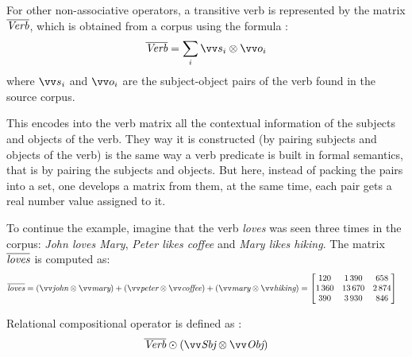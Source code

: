 
For other non-associative operators, a transitive verb is represented by the matrix $\overline{\text{\it Verb}}$, which is obtained from a corpus using the formula \cite{Grefenstette:2011:ESC:2145432.2145580}:
$$
\overline{\text{\it Verb}} = \sum_i\ov{s_i} \otimes \ov{o_i}
$$
where $\ov{s_i}$ and $\ov{o_i}$ are the subject-object pairs of the verb found in the source corpus.

This encodes into the verb matrix all the contextual information of the subjects and objects of the verb. They way it is constructed (by pairing subjects and objects of the verb) is the same way a verb predicate is built in formal semantics, that is by pairing the subjects and objects. But here, instead of packing the pairs into a set, one develops a matrix from them, at the same time, each pair gets a real number value assigned to it.

To continue the example, imagine that the verb \textit{loves} was seen three times in the corpus: \textit{John loves Mary}, \textit{Peter likes coffee} and \textit{Mary likes hiking}. The matrix $\overline{\text{\it loves}}$ is computed as:
\begin{align*}
  \overline{\text{\it loves}} &= (\ov{\text{\it john}} \otimes \ov{\text{\it mary}}) + %
                                 (\ov{\text{\it peter}} \otimes \ov{\text{\it coffee}}) + %
                                 (\ov{\text{\it mary}} \otimes \ov{\text{\it hiking}}) = %
                                \begin{bmatrix}
                                     120 &  1\,390 &    658 \\
                                  1\,360 & 13\,670 & 2\,874 \\
                                     390 &  3\,930 &    846
                                \end{bmatrix}
\end{align*}

Relational compositional operator is defined as \cite{Grefenstette:2011:ESC:2145432.2145580}:
\begin{equation*}
  \overline{\text{\it Verb}} \odot (\ov{\text{\it Sbj}} \otimes \ov{\text{\it Obj}})
\end{equation*}

